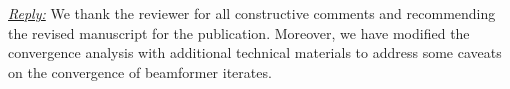 
\vspace{1eM}
\underline{\textit{Reply:}} We thank the reviewer for all constructive comments and recommending the revised manuscript for the publication. Moreover, we have modified the convergence analysis with additional technical materials to address some caveats on the convergence of beamformer iterates.